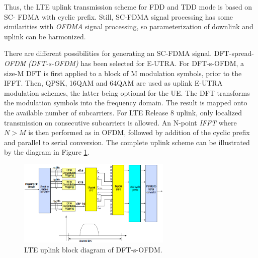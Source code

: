 Thus, the LTE uplink transmission scheme for FDD and TDD mode is based on SC-
FDMA with cyclic prefix. Still, SC-FDMA signal processing has some similarities
with \textit{OFDMA} signal processing, so parameterization of downlink and
uplink can be harmonized.

There are different possibilities for generating an SC-FDMA signal. DFT-spread-
\textit{OFDM} \textit{(DFT-s-OFDM)} has been selected for E-UTRA. For
DFT-s-OFDM, a size-M DFT is first applied to a block of M modulation symbols,
prior to the IFFT. Then, QPSK, 16QAM and 64QAM are used as uplink E-UTRA
modulation schemes, the latter being optional for the UE. The DFT transforms the
modulation symbols into the frequency domain. The result is mapped onto the
available number of subcarriers. For LTE Release 8 uplink, only localized
transmission on consecutive subcarriers is allowed. An N-point \textit{IFFT}
where $N>M$ is then performed as in OFDM, followed by addition of the cyclic
prefix and parallel to serial conversion. The complete uplink scheme can be
illustrated by the diagram in Figure \ref{fig:uplinkbd}.

\begin{figure}[htbp]
    \centering
    \includegraphics[width=0.65\textwidth]{./figures/uplink_scheme}
    \caption{ LTE uplink block diagram of DFT-s-OFDM.
    \label{fig:uplinkbd}}
\end{figure}
